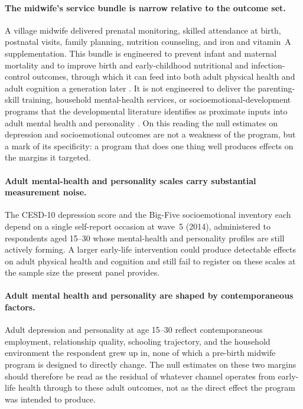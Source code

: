 \paragraph{The midwife's service bundle is narrow relative to the outcome set.} A village midwife delivered prenatal monitoring, skilled attendance at birth, postnatal visits, family planning, nutrition counseling, and iron and vitamin~A supplementation. This bundle is engineered to prevent infant and maternal mortality and to improve birth and early-childhood nutritional and infection-control outcomes, through which it can feed into both adult physical health and adult cognition a generation later \autocite{almondcurrie2011, currievogl2013}. It is not engineered to deliver the parenting-skill training, household mental-health services, or socioemotional-development programs that the developmental literature identifies as proximate inputs into adult mental health and personality \autocite{webb2024,sorrenti2025}. On this reading the null estimates on depression and socioemotional outcomes are not a weakness of the program, but a mark of its specificity: a program that does one thing well produces effects on the margins it targeted.

\paragraph{Adult mental-health and personality scales carry substantial measurement noise.} The CESD-10 depression score and the Big-Five socioemotional inventory each depend on a single self-report occasion at wave~5 (2014), administered to respondents aged 15--30 whose mental-health and personality profiles are still actively forming. A larger early-life intervention could produce detectable effects on adult physical health and cognition and still fail to register on these scales at the sample size the present panel provides.

\paragraph{Adult mental health and personality are shaped by contemporaneous factors.} Adult depression and personality at age 15--30 reflect contemporaneous employment, relationship quality, schooling trajectory, and the household environment the respondent grew up in, none of which a pre-birth midwife program is designed to directly change. The null estimates on these two margins should therefore be read as the residual of whatever channel operates from early-life health through to these adult outcomes, not as the direct effect the program was intended to produce.

